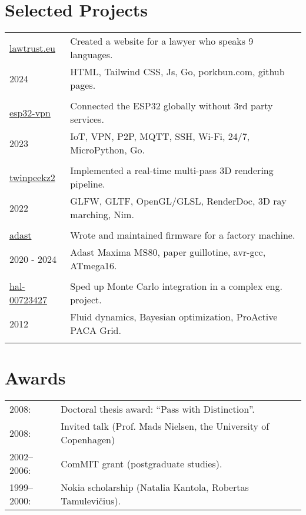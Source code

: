 \documentclass[a4paper,11pt]{article}
\begin{document}
\section*{Selected Projects}
\label{sect:pubs}

\begin{tabular}{ll}

\href{https://github.com/aabbtree77/law2}{lawtrust.eu} & Created a website for a lawyer who speaks 9 languages.\\
               2024    & HTML, Tailwind CSS, Js, Go, porkbun.com, github pages.\\
                       &\\
\href{https://github.com/aabbtree77/esp32-vpn}{esp32-vpn} & Connected the ESP32 globally without 3rd party services.\\
               2023    & IoT, VPN, P2P, MQTT, SSH, Wi-Fi, 24/7, MicroPython, Go.\\
                       &\\
\href{https://github.com/aabbtree77/twinpeekz2}{twinpeekz2}    & Implemented a real-time multi-pass 3D rendering pipeline.\\
                   2022       & GLFW, GLTF, OpenGL/GLSL, RenderDoc, 3D ray marching, Nim.\\
                          &\\
\href{https://github.com/aabbtree77/adast}{adast} & Wrote and maintained firmware for a factory machine. \\
2020 - 2024 & Adast Maxima MS80, paper guillotine, avr-gcc, ATmega16. \\
     &\\                        
\href{https://hal.archives-ouvertes.fr/hal-00723427}{hal-00723427} & Sped up Monte Carlo integration in a complex eng. project.\\
                     2012 & Fluid dynamics, Bayesian optimization, ProActive PACA Grid.\\
                          &  \\        
\end{tabular}

%


%
%
\section*{Awards}
%
\begin{tabular}{ll}
        2008: & Doctoral thesis award: “Pass with Distinction”.\\
        2008: & Invited talk (Prof. Mads Nielsen, the University of Copenhagen)\\
        2002--2006:& ComMIT grant (postgraduate studies).\\
        1999--2000:& Nokia scholarship (Natalia Kantola, Robertas Tamulevi\v{c}ius).
\end{tabular}
%
%

\end{document}
